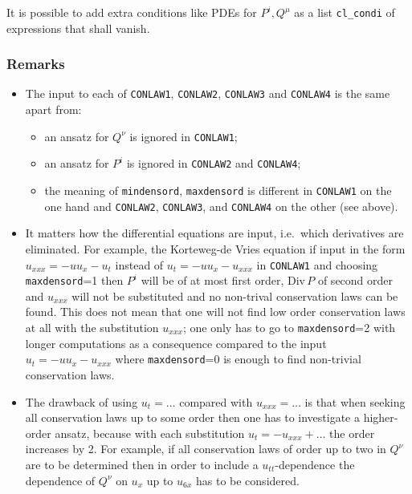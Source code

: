 It is possible to add extra conditions like PDEs for $P^i, Q^{\mu}$ as
a list \texttt{cl\_condi} of expressions that shall vanish.

\subsubsection{Remarks}

\begin{itemize}

\item The input to each of \texttt{CONLAW1}, \texttt{CONLAW2},
  \texttt{CONLAW3} and \texttt{CONLAW4} is the same apart from:
  \begin{itemize}
  \item an ansatz for $Q^{\nu}$ is ignored in \texttt{CONLAW1};
  \item an ansatz for $P^i$ is ignored in \texttt{CONLAW2} and
    \texttt{CONLAW4};
  \item the meaning of \texttt{mindensord}, \texttt{maxdensord} is
    different in \texttt{CONLAW1} on the one hand and
    \texttt{CONLAW2}, \texttt{CONLAW3}, and \texttt{CONLAW4} on the
    other (see above).
  \end{itemize}

\item It matters how the differential equations are input, i.e.\ which
  derivatives are eliminated.  For example, the Korteweg-de Vries
  equation if input in the form $u_{xxx}=-uu_x-u_t$ instead of
  $u_t=-uu_x-u_{xxx}$ in \texttt{CONLAW1} and choosing
  \texttt{maxdensord}=1 then $P^i$ will be of at most first order,
  Div\,$P$ of second order and $u_{xxx}$ will not be substituted and
  no non-trival conservation laws can be found.  This does not mean
  that one will not find low order conservation laws at all with the
  substitution $u_{xxx}$; one only has to go to \texttt{maxdensord}=2
  with longer computations as a consequence compared to the input
  $u_t=-uu_x-u_{xxx}$ where \texttt{maxdensord}=0 is enough to find
  non-trivial conservation laws.

\item The drawback of using $u_t=\ldots$ compared with
  $u_{xxx}=\ldots$ is that when seeking all conservation laws up to
  some order then one has to investigate a higher-order ansatz,
  because with each substitution $u_t=-u_{xxx}+\ldots$ the order
  increases by 2.  For example, if all conservation laws of order up
  to two in $Q^{\nu}$ are to be determined then in order to include a
  $u_{tt}$-dependence the dependence of $Q^{\nu}$ on $u_x$ up to
  $u_{6x}$ has to be considered.


\end{itemize}
